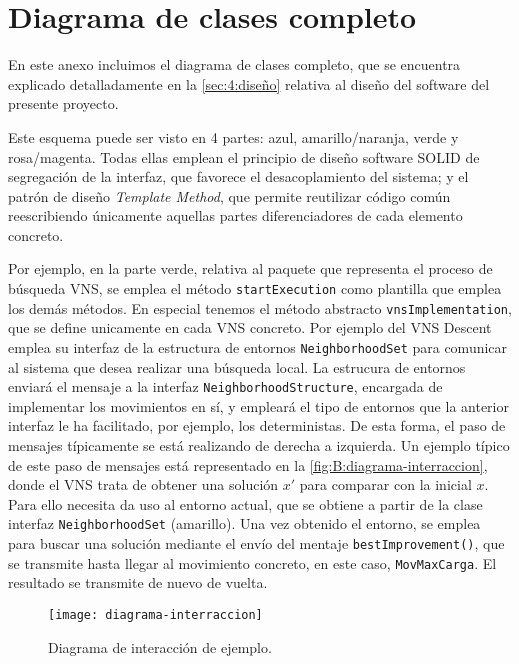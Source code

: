 \graphicspath{{anexos/AnexoB-Diagrama-Clases-Completo/recursos/}}

\section{Diagrama de clases completo} \label{Anexo:diagrama-clases}

En este anexo incluimos el diagrama de clases completo, que se encuentra explicado detalladamente en la \autoref{sec:4:diseño} relativa al diseño del software del presente proyecto.

Este esquema puede ser visto en 4 partes: azul, amarillo/naranja, verde y rosa/magenta. Todas ellas emplean el principio de diseño software SOLID de segregación de la interfaz, que favorece el desacoplamiento del sistema; y el patrón de diseño \textit{Template Method}, que permite reutilizar código común reescribiendo únicamente aquellas partes diferenciadores de cada elemento concreto.

Por ejemplo, en la parte verde, relativa al paquete que representa el proceso de búsqueda VNS, se emplea el método \texttt{startExecution} como plantilla que emplea los demás métodos. En especial tenemos el método abstracto \texttt{vnsImplementation}, que se define unicamente en cada VNS concreto. Por ejemplo del VNS Descent emplea su interfaz de la estructura de entornos \texttt{NeighborhoodSet} para comunicar al sistema que desea realizar una búsqueda local. La estrucura de entornos enviará el mensaje a la interfaz \texttt{NeighborhoodStructure}, encargada de implementar los movimientos en sí, y empleará el tipo de entornos que la anterior interfaz le ha facilitado, por ejemplo, los deterministas. De esta forma, el paso de mensajes típicamente se está realizando de derecha a izquierda. Un ejemplo típico de este paso de mensajes está representado en la \autoref{fig:B:diagrama-interraccion}, donde el VNS trata de obtener una solución $x'$ para comparar con la inicial $x$. Para ello necesita da uso al entorno actual, que se obtiene a partir de la clase interfaz \texttt{NeighborhoodSet} (amarillo). Una vez obtenido el entorno, se emplea para buscar una solución mediante el envío del mentaje \texttt{bestImprovement()}, que se transmite hasta llegar al movimiento concreto, en este caso, \texttt{MovMaxCarga}. El resultado se transmite de nuevo de vuelta.

\begin{figure}[h]
	\centering
	\texttt{[image: diagrama-interraccion]}
	\caption{Diagrama de interacción de ejemplo.}
	\label{fig:B:diagrama-interraccion}
\end{figure}

\begin{landscape}
	
\end{landscape}
